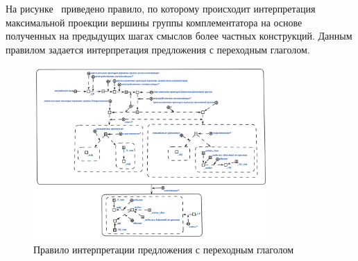 На рисунке~\textit{} приведено правило, по которому происходит интерпретация максимальной проекции вершины группы комплементатора на основе полученных на предыдущих шагах смыслов более частных конструкций.
Данным правилом задается интерпретация предложения с переходным глаголом.

\begin{figure}[h]
    \centering
    \includegraphics[width=0.8\textwidth]{images/part2/chapter_lang/d_sem_7.png}
    \caption{Правило интерпретации предложения с переходным глаголом}
    \label{fig:d_sem_7}
\end{figure}

%
